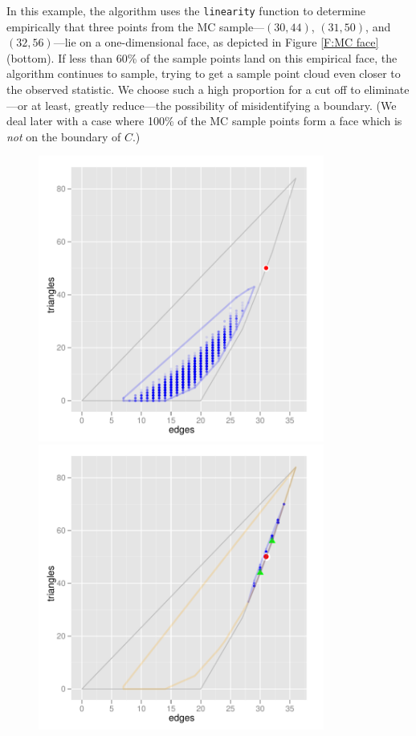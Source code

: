 In this example, the algorithm uses the \texttt{linearity} function to determine empirically that three points from the MC sample---$(30,44)$, $(31,50)$, 
and $(32,56)$---lie on a one-dimensional face, as depicted in Figure \ref{F:MC face} 
(bottom).  If less than 60\% of the sample points land on this empirical face, the 
algorithm continues to sample, trying to get a sample point cloud even closer to the 
observed statistic.  We choose such a high proportion for a cut off to eliminate---or 
at least, greatly reduce---the possibility of misidentifying a boundary.
(We deal later with a case where 100\% of the MC sample points form a face which is 
\emph{not} on the boundary of $C$.)
\begin{figure}[!ht]
\centering
\includegraphics[width=3.7in]{Figures/MCsample-boundary}
\includegraphics[width=3.7in]{Figures/MCsample-77face}

\end{figure}
